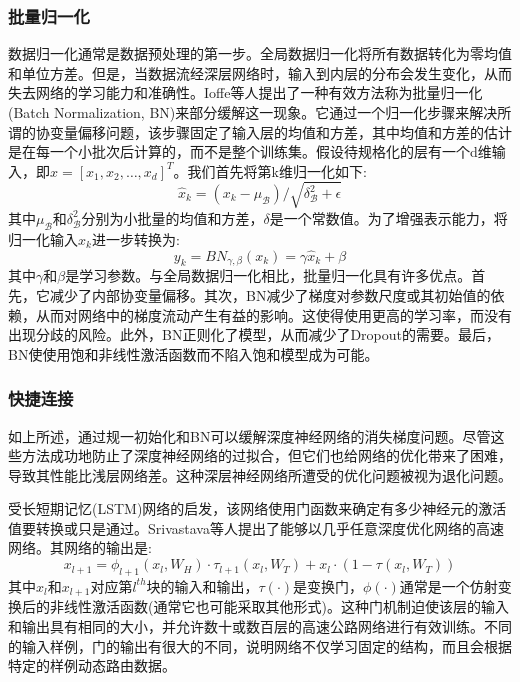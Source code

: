 \documentclass[final]{cvpr}
\begin{document}
\subsubsection{批量归一化}
数据归一化通常是数据预处理的第一步。全局数据归一化将所有数据转化为零均值和单位方差。但是，当数据流经深层网络时，输入到内层的分布会发生变化，从而失去网络的学习能力和准确性。Ioffe等人提出了一种有效方法称为批量归一化(Batch Normalization, BN)来部分缓解这一现象。它通过一个归一化步骤来解决所谓的协变量偏移问题，该步骤固定了输入层的均值和方差，其中均值和方差的估计是在每一个小批次后计算的，而不是整个训练集。假设待规格化的层有一个d维输入，即$x = [x_1, x_2,…,x_d]^T$。我们首先将第k维归一化如下:
\begin{equation}
	\hat{x}_k = (x_k-\mu_\mathcal{B})/\sqrt{\delta^2_\mathcal{B} + \epsilon}
\end{equation}
其中$\mu_\mathcal{B}$和$\delta^2_\mathcal{B}$分别为小批量的均值和方差，$\delta$是一个常数值。为了增强表示能力，将归一化输入$\hat{x}_k$进一步转换为:
\begin{equation}
	y_k = BN_{\gamma,\beta}(x_k)=\gamma\hat{x}_k+\beta
\end{equation}
其中$\gamma$和$\beta$是学习参数。与全局数据归一化相比，批量归一化具有许多优点。首先，它减少了内部协变量偏移。其次，BN减少了梯度对参数尺度或其初始值的依赖，从而对网络中的梯度流动产生有益的影响。这使得使用更高的学习率，而没有出现分歧的风险。此外，BN正则化了模型，从而减少了Dropout的需要。最后，BN使使用饱和非线性激活函数而不陷入饱和模型成为可能。
\subsubsection{快捷连接}
如上所述，通过规一初始化和BN可以缓解深度神经网络的消失梯度问题。尽管这些方法成功地防止了深度神经网络的过拟合，但它们也给网络的优化带来了困难，导致其性能比浅层网络差。这种深层神经网络所遭受的优化问题被视为退化问题。

受长短期记忆(LSTM)网络的启发，该网络使用门函数来确定有多少神经元的激活值要转换或只是通过。Srivastava等人提出了能够以几乎任意深度优化网络的高速网络。其网络的输出是:
\begin{equation}
	x_{l+1} = \phi_{l+1}(x_l,W_H)·\tau_{l+1}(x_l,W_T)+x_l·(1-\tau(x_l,W_T))
\end{equation}
其中$x_l$和$x_{l+1}$对应第$l^{th}$块的输入和输出，$\tau(·)$是变换门，$\phi(·)$通常是一个仿射变换后的非线性激活函数(通常它也可能采取其他形式)。这种门机制迫使该层的输入和输出具有相同的大小，并允许数十或数百层的高速公路网络进行有效训练。不同的输入样例，门的输出有很大的不同，说明网络不仅学习固定的结构，而且会根据特定的样例动态路由数据。
\end{document}
